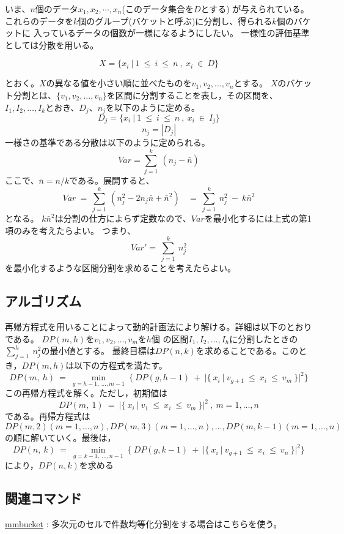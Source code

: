 いま、$n$個のデータ$x_1,x_2,\cdots,x_n$(このデータ集合を$D$とする) が与えられている。
これらのデータを$k$個のグループ(バケットと呼ぶ)に分割し、得られる$k$個のバケットに
入っているデータの個数が一様になるようにしたい。
一様性の評価基準としては分散を用いる。

\[
X=\{x_i~|~1~\leq~i~\leq~n~,~x_i~\in~D\}
  \]


とおく。$X$の異なる値を小さい順に並べたものを$v_1,v_2,\dots,v_n$とする。
$X$のバケット分割とは、$\{v_1,v_2,\dots,v_n\}$を区間に分割することを表し，その区間を、$I_1,I_2,\dots,I_k$とおき、$D_j$、$n_j$を以下のように定める。
\[
 D_j=\{x_i~|~1~\leq~i~\leq~n~,~x_i~\in~I_j\}
  \]
  \[
 n_j=|D_j|
 \]
一様さの基準である分散は以下のように定められる。\\
\[
Var=\sum_{j=1}^{k}~(n_j-\bar{n})
\]
ここで、$\bar{n}=n/k$である。展開すると、\\
\[
Var~=~\sum_{j=1}^{k}~(n_j^2-2n_j\bar{n}+\bar{n}^2)~~~~=~\sum_{j=1}^{k}~n_j^2~-~k\bar{n}^2
\]
となる。
$k\bar{n}^2$は分割の仕方によらず定数なので、$Var$を最小化するには上式の第1項のみを考えたらよい。
つまり、
\[
Var'=~\sum_{j=1}^{k}~n_j^2
\]
を最小化するような区間分割を求めることを考えたらよい。

\subsection*{アルゴリズム}

再帰方程式を用いることによって動的計画法により解ける。詳細は以下のとおりである。
$DP(m,h)$を$v_1,v_2,\dots,v_m$を$h$個
の区間$I_1,I_2,\dots,I_h$に分割したときの$\displaystyle \sum_{j=1}^{h}~n_j^2$の最小値とする。
最終目標は$DP(n,k)$を求めることである。このとき，$DP(m,h)$は以下の方程式を満たす。
\[
DP(m,~h)~=~\min_{g=h-1,~\dots,m-1}~\{~DP(g,h-1)~+~|\{~x_i~|~v_{g+1}~\leq~x_i~\leq~v_m~\}|^2\}
\]
この再帰方程式を解く。ただし，初期値は
\[
DP(m,~1)~=~|\{~x_i~|~v_1~\leq~x_i~\leq~v_m~\}|^2~,~m=1,...,n
\]
である。再帰方程式は
$DP(m,2)(m=1,\dots,n),DP(m,3)(m=1,\dots,n),\dots,DP(m,k-1)(m=1,\dots,n)$
の順に解いていく。最後は，
\[
DP(n,~k)~=~\min_{g=k-1,~\dots,n-1}~\{~DP(g,k-1)~+~|\{~x_i~|~v_{g+1}~\leq~x_i~\leq~v_n~\}|^2\}
\]
により，$DP(n,k)$を求める

\subsection*{関連コマンド}
\hyperref[sect:mmbucket]{mmbucket} : 多次元のセルで件数均等化分割をする場合はこちらを使う。

%
